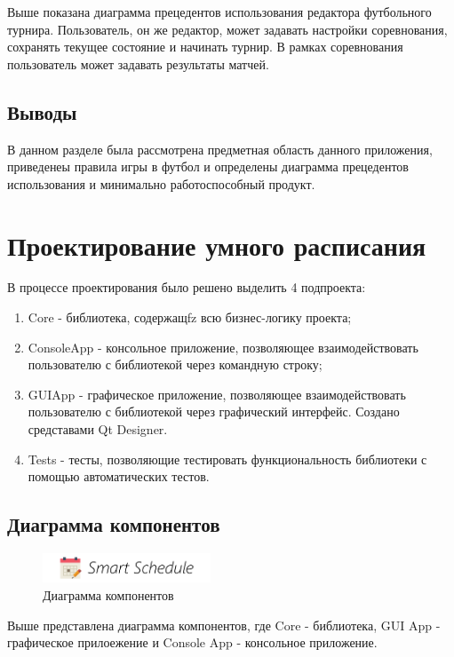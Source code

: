 Выше показана диаграмма прецедентов использования редактора футбольного турнира. Пользователь, он же редактор, может задавать настройки соревнования, сохранять текущее состояние и начинать турнир. В рамках соревнования пользователь может задавать результаты матчей.

\subsection{Выводы}
В данном разделе была рассмотрена предметная область данного приложения, приведенеы правила игры в футбол и определены диаграмма прецедентов использования и минимально работоспособный продукт.

\section{Проектирование умного расписания}

В процессе проектирования было решено выделить 4 подпроекта:
\begin{enumerate}
\item Core - библиотека, содержащfz всю бизнес-логику проекта;
\item ConsoleApp - консольное приложение, позволяющее взаимодействовать пользователю с библиотекой через командную строку;
\item GUIApp - графическое приложение, позволяющее взаимодействовать пользователю с библиотекой через графический интерфейс. Создано средставами Qt Designer.
\item Tests - тесты, позволяющие тестировать функциональность библиотеки с помощью автоматических тестов.
\end{enumerate}

\subsection{Диаграмма компонентов}

\begin{figure}[H]
	\begin{center}
		\includegraphics[width=5cm]{pics/logo}
		\caption{Диаграмма компонентов} 
		\label{pic:component_diagram} %
	\end{center}
\end{figure}

Выше представлена диаграмма компонентов, где Core - библиотека, GUI App - графическое прилоежение и Console App - консольное приложение.

